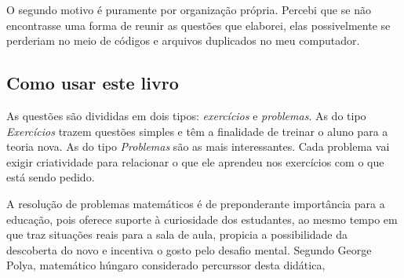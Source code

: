 \documentclass[10pt,a4paper]{report}
\theoremstyle{definition}
\begin{document}
O segundo motivo é puramente por organização própria. Percebi que se não encontrasse uma forma de reunir as questões que elaborei, elas possivelmente se perderiam no meio de códigos e arquivos duplicados no meu computador.


\subsection*{Como usar este livro}
As questões são divididas em dois tipos: \emph{exercícios} e \emph{problemas}. As do tipo \emph{Exercícios} trazem questões simples e têm a finalidade de treinar o aluno para a teoria nova. As do tipo \emph{Problemas} são as mais interessantes. Cada problema vai exigir criatividade para relacionar o que ele aprendeu nos exercícios com o que está sendo pedido.


A resolução de problemas matemáticos é de preponderante importância para a educação, pois oferece suporte à curiosidade dos estudantes, ao mesmo tempo em que traz situações reais para a sala de aula, propicia a possibilidade da descoberta do novo e incentiva o gosto pelo desafio mental. Segundo George Polya, matemático húngaro considerado percurssor desta didática, 
\end{document}
